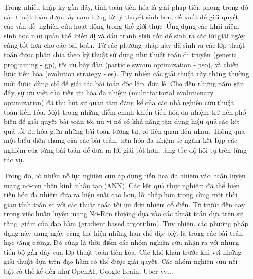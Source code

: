 Trong nhiều thập kỷ gần đây, tính toán tiến hóa là giải pháp tiên phong trong đó các thuật toán được lấy cảm hứng từ lý thuyết sinh học, đề xuất để giải quyết các vấn đề, nghiên cứu hoạt động trong thế giới thực. Ứng dụng các khái niệm sinh học như quần thể, biến dị và đấu tranh sinh tồn để sinh ra các lời giải ngày càng tốt hơn cho các bài toán. Từ các phương pháp này đã sinh ra các lớp thuật toán được phân chia theo kỹ thuật sử dụng như thuật toán di truyền (genetic programing - gp), tối ưu bày đàn (particle swarm optimization - pso), và chiến lược tiến hóa (evolution strategy - es). Tuy nhiên các giải thuật này thông thường mới được dùng chỉ để giải các bài toán độc lập, đơn lẻ. Cho đến những năm gần đây, sự ưu việt của tiến ưu hóa đa nhiệm (multitfactorial evolutionary optimization) đã thu hút sự quan tâm đáng kể của các nhà nghiên cứu thuật toán tiến hóa. Một trong những điểm chính khiến tiến hóa đa nhiệm trở nên phổ biến để giải quyết bài toán tối ưu vì nó có khả năng tận dụng hiệu quả các kết quả tối ưu hóa giữa những bài toán tương tự, có liên quan đến nhau. Thông qua một biểu diễn chung của các bài toán, tiến hóa đa nhiệm sẽ ngầm kết hợp các nghiệm của từng bài toán để đưa ra lời giải tốt hơn, tăng tốc độ hội tụ trên từng tác vụ.

Trong đó, có nhiều nỗ lực nghiên cứu áp dụng tiến hóa đa nhiệm vào huấn luyện mạng nơ-ron thần kinh
nhân tạo (ANN). Các kết quả thực nghiệm đã thể hiện tiến hóa đa nhiệm đưa ra hiệu suất cao hơn, lỗi thấp hơn trong cùng một thời gian tính toán so với các thuật toán tối ưu đơn nhiệm cổ điển. Từ trước đến nay trong việc huấn luyện mạng Nơ-Ron thường dựa vào các thuật toán dựa trên sự tăng, giảm của đạo hàm (gradient based argorithm). Tuy nhiên, các phương pháp dạng này đang ngày càng thể hiện những hạn chế đặc biệt là trong các bài toán học tăng cường. Đó cũng là thời điểm các nhóm nghiên cứu nhận ra với những tiến bộ gần đây của lớp thuật toán tiến hóa. Các khó khăn trước khi với những giải thuật dựa trên đạo hàm có thể được giải quyết. Các nhóm nghiên cứu nổi bật có thể kể đến như OpenAI, Google Brain, Uber vv... 




